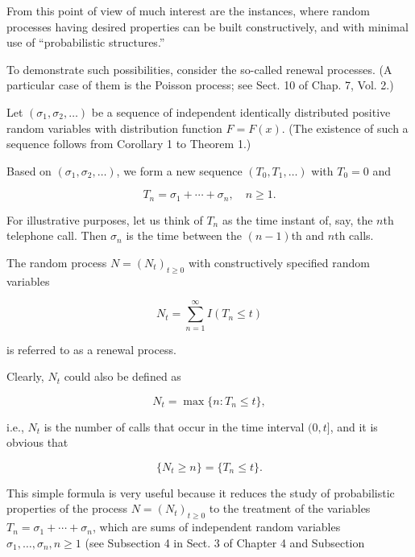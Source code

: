 From this point of view of much interest are the instances, where random processes having desired properties can be built constructively, and with minimal use of “probabilistic structures.”

To demonstrate such possibilities, consider the so-called renewal processes. (A particular case of them is the Poisson process; see Sect. 10 of Chap. 7, Vol. 2.)

Let $(\sigma_1, \sigma_2, \ldots)$ be a sequence of independent identically distributed positive random variables with distribution function $F = F(x)$. (The existence of such a sequence follows from Corollary 1 to Theorem 1.)

Based on $(\sigma_1, \sigma_2, \ldots)$, we form a new sequence $(T_0, T_1, \ldots)$ with $T_0 = 0$ and

$$T_n = \sigma_1 + \cdots + \sigma_n, \quad n \geq 1.$$

For illustrative purposes, let us think of $T_n$ as the time instant of, say, the $n$th telephone call. Then $\sigma_n$ is the time between the $(n-1)$th and $n$th calls.

The random process $N = (N_t)_{t \geq 0}$ with constructively specified random variables

$$N_t = \sum_{n=1}^{\infty} I(T_n \leq t)$$

is referred to as a renewal process.

Clearly, $N_t$ could also be defined as

$$N_t = \max\{n : T_n \leq t\},$$

i.e., $N_t$ is the number of calls that occur in the time interval $(0, t]$, and it is obvious that

$$\{N_t \geq n\} = \{T_n \leq t\}.$$

This simple formula is very useful because it reduces the study of probabilistic properties of the process $N = (N_t)_{t \geq 0}$ to the treatment of the variables $T_n = \sigma_1 + \cdots + \sigma_n$, which are sums of independent random variables $\sigma_1, \ldots, \sigma_n, n \geq 1$ (see Subsection 4 in Sect. 3 of Chapter 4 and Subsection

